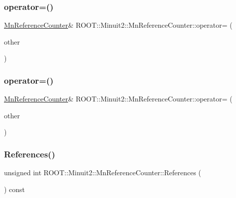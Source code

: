\subsubsection{\texorpdfstring{operator=()}{operator=()}\hspace{0.1cm}{\footnotesize\ttfamily [1/2]}}
{\footnotesize\ttfamily \mbox{\hyperlink{classROOT_1_1Minuit2_1_1MnReferenceCounter}{Mn\+Reference\+Counter}}\& R\+O\+O\+T\+::\+Minuit2\+::\+Mn\+Reference\+Counter\+::operator= (\begin{DoxyParamCaption}\item[{const \mbox{\hyperlink{classROOT_1_1Minuit2_1_1MnReferenceCounter}{Mn\+Reference\+Counter}} \&}]{other }\end{DoxyParamCaption})\hspace{0.3cm}{\ttfamily [inline]}}

\mbox{\label{classROOT_1_1Minuit2_1_1MnReferenceCounter_a6a952f3f15d5dcfa10647c9df13a7caa}} 
\subsubsection{\texorpdfstring{operator=()}{operator=()}\hspace{0.1cm}{\footnotesize\ttfamily [2/2]}}
{\footnotesize\ttfamily \mbox{\hyperlink{classROOT_1_1Minuit2_1_1MnReferenceCounter}{Mn\+Reference\+Counter}}\& R\+O\+O\+T\+::\+Minuit2\+::\+Mn\+Reference\+Counter\+::operator= (\begin{DoxyParamCaption}\item[{const \mbox{\hyperlink{classROOT_1_1Minuit2_1_1MnReferenceCounter}{Mn\+Reference\+Counter}} \&}]{other }\end{DoxyParamCaption})\hspace{0.3cm}{\ttfamily [inline]}}

\mbox{\label{classROOT_1_1Minuit2_1_1MnReferenceCounter_a8c4e8a4427e3f5eeaad4001a364f8a5a}} 
\subsubsection{\texorpdfstring{References()}{References()}\hspace{0.1cm}{\footnotesize\ttfamily [1/2]}}
{\footnotesize\ttfamily unsigned int R\+O\+O\+T\+::\+Minuit2\+::\+Mn\+Reference\+Counter\+::\+References (\begin{DoxyParamCaption}{ }\end{DoxyParamCaption}) const\hspace{0.3cm}{\ttfamily [inline]}}

